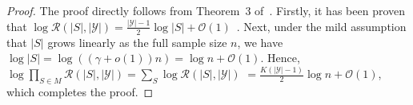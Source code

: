 \begin{proof}
	The proof directly follows from Theorem~3 of~\citep{silander2008factorized}. Firstly, it has been proven that $\log \mathcal{R}(|S|, |\mathscr{Y}|) = \frac{|\mathscr{Y}| - 1}{2} \log |S| + \mathcal{O}(1)$~\citep{rissanen1996fisher}. Next, under the mild assumption that $|S|$ grows linearly as the full sample size $n$, we have $\log |S| = \log ((\gamma + o(1))n) = \log n + \mathcal{O}(1)$. Hence, $\log \prod_{S \in M} \mathcal{R}(|S|, |\mathscr{Y}|) = \sum_{S}\log \mathcal{R}(|S|, |\mathscr{Y}|)$ $= \frac{K(|\mathscr{Y}| - 1)}{2} \log n + \mathcal{O}(1)$, which completes the proof. 
\end{proof}
